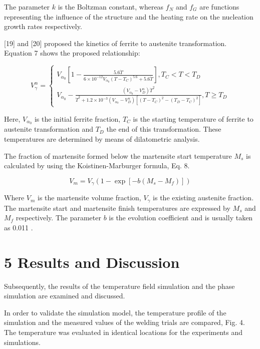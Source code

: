 \documentclass[10pt]{article}
\begin{document}
The parameter $k$ is the Boltzman constant, whereas $f_{N}$ and $f_{G}$ are functions representing the influence of the structure and the heating rate on the nucleation growth rates respectively.

[19] and [20] proposed the kinetics of ferrite to austenite transformation. Equation 7 shows the proposed relationship:

\[
V_{\gamma}^{\alpha}=\left\{\begin{array}{c}
V_{\alpha_{0}}\left[1-\frac{5.6 \dot{T}}{6 \times 10^{-12} V_{\alpha_{0}}\left(T-T_{C}\right)^{5.6}+5.6 \dot{T}}\right], T_{C}<T<T_{D}  \tag{7}\\
V_{\alpha_{0}}-\frac{\left(V_{\alpha_{0}}-V_{D}^{\alpha}\right) \dot{T}^{2}}{\dot{T}^{2}+1.2 \times 10^{-3}\left(V_{\alpha_{0}}-V_{D}^{\alpha}\right)\left[\left(T-T_{C}\right)^{2}-\left(T_{D}-T_{C}\right)^{2}\right]}, T \geq T_{D}
\end{array}\right.
\]

Here, $V_{\alpha_{0}}$ is the initial ferrite fraction, $T_{C}$ is the starting temperature of ferrite to austenite transformation and $T_{D}$ the end of this transformation. These temperatures are determined by means of dilatometric analysis.

The fraction of martensite formed below the martensite start temperature $M_{s}$ is calculated by using the Koistinen-Marburger formula, Eq. 8.


\begin{equation*}
V_{m}=V_{\gamma}\left(1-\exp \left[-b\left(M_{s}-M_{f}\right)\right]\right) \tag{8}
\end{equation*}


Where $V_{m}$ is the martensite volume fraction, $V_{\gamma}$ is the existing austenite fraction. The martensite start and martensite finish temperatures are expressed by $M_{s}$ and $M_{f}$ respectively. The parameter $b$ is the evolution coefficient and is usually taken as 0.011 .

\section*{5 Results and Discussion}
Subsequently, the results of the temperature field simulation and the phase simulation are examined and discussed.

In order to validate the simulation model, the temperature profile of the simulation and the measured values of the welding trials are compared, Fig. 4. The temperature was evaluated in identical locations for the experiments and simulations.
\end{document}
